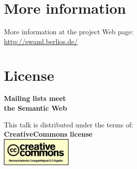 \documentclass[spanish,notes=hide,16pt]{beamer}
\begin{document}
\section{More information}
\frame
{
  \begin{center}
    More information at the project Web page:\\
    \vspace{1cm}
    \LARGE{\href{http://swaml.berlios.de/}{http://swaml.berlios.de/}}\\
  \end{center}

}

\section{License}
\frame
{
  \begin{center}
    \LARGE{\textbf{Mailing lists meet\\the Semantic Web}}\\
    \vspace{1cm}
    \vspace{1cm}
    \begin{tiny}
	This talk is distributed under the terms of:\\
	\textbf{CreativeCommons license}\\
	\includegraphics[width=3.5cm]{images/creativecommons.png}
    \end{tiny}
  \end{center}
}
\end{document}

